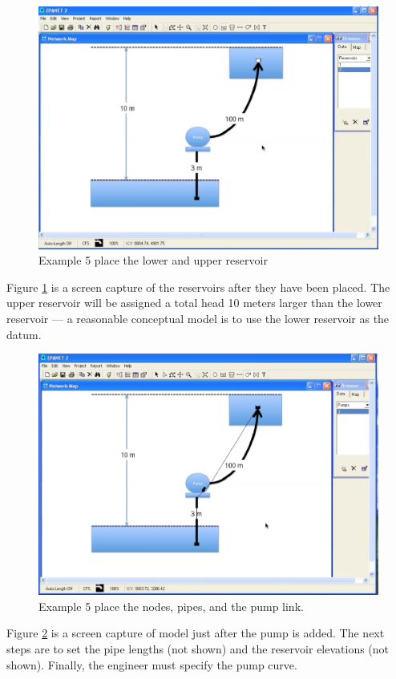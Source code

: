 \begin{figure}[htbp] %
   \centering
   \includegraphics[width=5in]{pump-reservoirs.pdf} 
   \caption{Example 5 place the lower and upper reservoir}
   \label{fig:pump-reservoirs.pdf}
\end{figure}
Figure \ref{fig:pump-reservoirs.pdf} is a screen capture of the reservoirs after they have been placed.  The upper reservoir will be assigned a total head 10 meters larger than the lower reservoir --- a reasonable conceptual model is to use the lower reservoir as the datum.
\newpage

\begin{figure}[htbp] %
   \centering
   \includegraphics[width=5in]{pump-pump.pdf} 
   \caption{Example 5 place the nodes, pipes, and the pump link.}
   \label{fig:pump-pump.pdf}
\end{figure}
Figure \ref{fig:pump-pump.pdf} is a screen capture of model just after the pump is added.   The next steps are to set the pipe lengths (not shown) and the reservoir elevations (not shown).   Finally, the engineer must specify the pump curve.
\newpage

